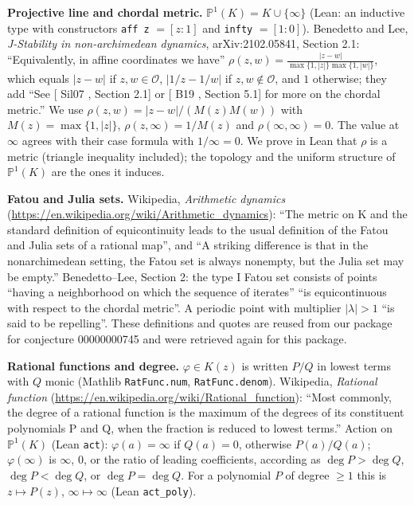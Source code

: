 \documentclass[11pt]{article}
\theoremstyle{definition}
\newcommand{\PP}{\mathbb{P}^1}
\begin{document}
\textbf{Projective line and chordal metric.} $\PP(K)=K\cup\{\infty\}$ (Lean: an inductive type with
constructors \texttt{aff z} $=[z:1]$ and \texttt{infty} $=[1:0]$). Benedetto and Lee, \emph{J-Stability
in non-archimedean dynamics}, arXiv:2102.05841, Section 2.1: ``Equivalently, in affine
coordinates we have'' $\rho(z,w)=\frac{|z-w|}{\max\{1,|z|\}\max\{1,|w|\}}$, which equals $|z-w|$ if
$z,w\in\mathcal{O}$, $|1/z-1/w|$ if $z,w\notin\mathcal{O}$, and $1$ otherwise; they add ``See
[ Sil07 , Section 2.1] or [ B19 , Section 5.1] for more on the chordal metric.'' We use
$\rho(z,w)=|z-w|/(M(z)M(w))$ with $M(z)=\max\{1,|z|\}$, $\rho(z,\infty)=1/M(z)$ and
$\rho(\infty,\infty)=0$. The value at $\infty$ agrees with their case formula with $1/\infty=0$. We
prove in Lean that $\rho$ is a metric (triangle inequality included); the topology and the uniform
structure of $\PP(K)$ are the ones it induces.

\textbf{Fatou and Julia sets.} Wikipedia, \emph{Arithmetic dynamics}
(\url{https://en.wikipedia.org/wiki/Arithmetic_dynamics}): ``The metric on K and the standard
definition of equicontinuity leads to the usual definition of the Fatou and Julia sets of a
rational map'', and ``A striking difference is that in the nonarchimedean setting, the Fatou set is
always nonempty, but the Julia set may be empty.'' Benedetto--Lee, Section 2: the type I Fatou set
consists of points ``having a neighborhood on which the sequence of iterates'' ``is equicontinuous
with respect to the chordal metric''. A periodic point with multiplier $|\lambda|>1$ ``is said to be
repelling''. These definitions and quotes are reused from our package for conjecture 00000000745
and were retrieved again for this package.

\textbf{Rational functions and degree.} $\varphi\in K(z)$ is written $P/Q$ in lowest terms with $Q$
monic (Mathlib \texttt{RatFunc.num}, \texttt{RatFunc.denom}). Wikipedia, \emph{Rational function}
(\url{https://en.wikipedia.org/wiki/Rational_function}): ``Most commonly, the degree of a rational
function is the maximum of the degrees of its constituent polynomials P and Q, when the fraction is
reduced to lowest terms.'' Action on $\PP(K)$ (Lean \texttt{act}): $\varphi(a)=\infty$ if $Q(a)=0$,
otherwise $P(a)/Q(a)$; $\varphi(\infty)$ is $\infty$, $0$, or the ratio of leading coefficients,
according as $\deg P>\deg Q$, $\deg P<\deg Q$, or $\deg P=\deg Q$. For a polynomial $P$ of degree
$\ge1$ this is $z\mapsto P(z)$, $\infty\mapsto\infty$ (Lean \texttt{act\_poly}).
\end{document}
